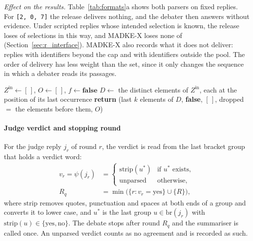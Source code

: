 \emph{Effect on the results.} Table~\ref{tab:formats}a shows both parsers on fixed replies. For \texttt{[2, 0, 7]} the release delivers nothing, and the debater then answers without evidence. Under scripted replies whose intended selection is known, the release loses \VSetBadRel{} of \VSelRel{} selections in this way, and MADKE-X loses none of \VSelX{} (Section~\ref{sec:r_interface}). MADKE-X also records what it does not deliver: \VDroppedX{} replies with identifiers beyond the cap and \VOutRangeX{} with identifiers outside the pool. The order of delivery has less weight than the set, since it only changes the sequence in which a debater reads its passages.

\begin{algorithm}[!htbp]
\caption{ParseEvidenceIDs (Eq.~\ref{eq:parse})}
\label{alg:parse}
$Z^{\mathrm{in}} \leftarrow [\,]$, $O \leftarrow [\,]$, $f \leftarrow \textbf{false}$\;
$D \leftarrow$ the distinct elements of $Z^{\mathrm{in}}$, each at the position of its last occurrence\;
\textbf{return} (last $k$ elements of $D$, \textbf{false}, $[\,]$, dropped $=$ the elements before them, $O$)\;
\end{algorithm}

\paragraph{Judge verdict and stopping round}
For the judge reply $j_r$ of round $r$, the verdict is read from the last bracket group that holds a verdict word:
\begin{equation}
\begin{aligned}
v_r = \psi(j_r) &=
\begin{cases}
\mathrm{strip}(u^\ast) & \text{if } u^\ast \text{ exists},\\
\text{unparsed} & \text{otherwise},
\end{cases}\\
R_q &= \min\big(\{r : v_r=\text{yes}\}\cup\{R\}\big),
\end{aligned}
\label{eq:verdict}
\end{equation}
where $\mathrm{strip}$ removes quotes, punctuation and spaces at both ends of a group and converts it to lower case, and $u^\ast$ is the last group $u\in \mathrm{br}(j_r)$ with $\mathrm{strip}(u)\in\{\text{yes},\text{no}\}$. The debate stops after round $R_q$ and the summariser is called once. An unparsed verdict counts as no agreement and is recorded as such.

